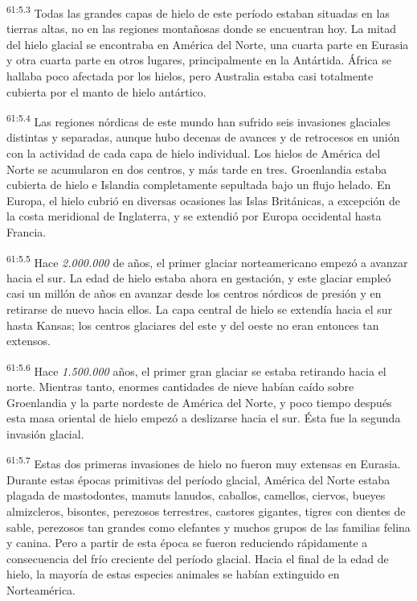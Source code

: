 \par
\textsuperscript{61:5.3} Todas las grandes capas de hielo de este período estaban situadas en las tierras altas, no en las regiones montañosas donde se encuentran hoy. La mitad del hielo glacial se encontraba en América del Norte, una cuarta parte en Eurasia y otra cuarta parte en otros lugares, principalmente en la Antártida. África se hallaba poco afectada por los hielos, pero Australia estaba casi totalmente cubierta por el manto de hielo antártico.

\par
\textsuperscript{61:5.4} Las regiones nórdicas de este mundo han sufrido seis invasiones glaciales distintas y separadas, aunque hubo decenas de avances y de retrocesos en unión con la actividad de cada capa de hielo individual. Los hielos de América del Norte se acumularon en dos centros, y más tarde en tres. Groenlandia estaba cubierta de hielo e Islandia completamente sepultada bajo un flujo helado. En Europa, el hielo cubrió en diversas ocasiones las Islas Británicas, a excepción de la costa meridional de Inglaterra, y se extendió por Europa occidental hasta Francia.

\par
\textsuperscript{61:5.5} Hace \textit{2.000.000} de años, el primer glaciar norteamericano empezó a avanzar hacia el sur. La edad de hielo estaba ahora en gestación, y este glaciar empleó casi un millón de años en avanzar desde los centros nórdicos de presión y en retirarse de nuevo hacia ellos. La capa central de hielo se extendía hacia el sur hasta Kansas; los centros glaciares del este y del oeste no eran entonces tan extensos.

\par
\textsuperscript{61:5.6} Hace \textit{1.500.000} años, el primer gran glaciar se estaba retirando hacia el norte. Mientras tanto, enormes cantidades de nieve habían caído sobre Groenlandia y la parte nordeste de América del Norte, y poco tiempo después esta masa oriental de hielo empezó a deslizarse hacia el sur. Ésta fue la segunda invasión glacial.

\par
\textsuperscript{61:5.7} Estas dos primeras invasiones de hielo no fueron muy extensas en Eurasia. Durante estas épocas primitivas del período glacial, América del Norte estaba plagada de mastodontes, mamuts lanudos, caballos, camellos, ciervos, bueyes almizcleros, bisontes, perezosos terrestres, castores gigantes, tigres con dientes de sable, perezosos tan grandes como elefantes y muchos grupos de las familias felina y canina. Pero a partir de esta época se fueron reduciendo rápidamente a consecuencia del frío creciente del período glacial. Hacia el final de la edad de hielo, la mayoría de estas especies animales se habían extinguido en Norteamérica.

